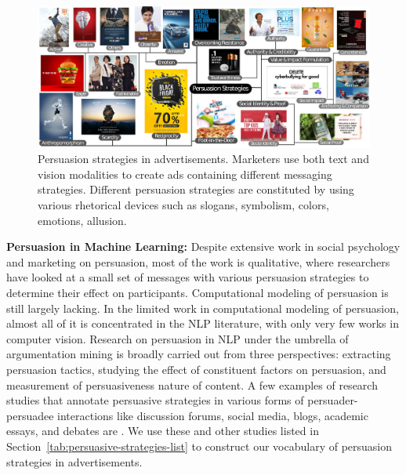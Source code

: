 \begin{landscape}
    \pagestyle{landscapeStyle}
\begin{figure}[t]
        \centering
        \includegraphics[width=1.5\textwidth]{images/flowchart.pdf}
        \caption{\small {} Persuasion strategies in advertisements. Marketers use both text and vision modalities to create ads containing different messaging strategies. Different persuasion strategies are constituted by using various rhetorical devices such as slogans, symbolism, colors, emotions, allusion.}
        \label{fig:persuasion-strategies-headline-image}
\end{figure}
\end{landscape}





\textbf{Persuasion in Machine Learning:} Despite extensive work in social psychology and marketing on persuasion, most of the work is qualitative, where researchers have looked at a small set of messages with various persuasion strategies to determine their effect on participants. Computational modeling of persuasion is still largely lacking. In the limited work in computational modeling of persuasion, almost all of it is concentrated in the NLP literature, with only very few works in computer vision.
Research on persuasion in NLP under the umbrella of argumentation mining is broadly carried out from three perspectives: extracting persuasion tactics, studying the effect of constituent factors on persuasion, and measurement of persuasiveness nature of content. A few examples of research studies that annotate persuasive strategies in various forms of persuader-persuadee interactions like discussion forums, social media, blogs, academic essays, and debates are \cite{anand2011believe,tan2016winning,chen2021weakly}. We use these and other studies listed in Section~\ref{tab:persuasive-strategies-list} to construct our vocabulary of persuasion strategies in advertisements. 

